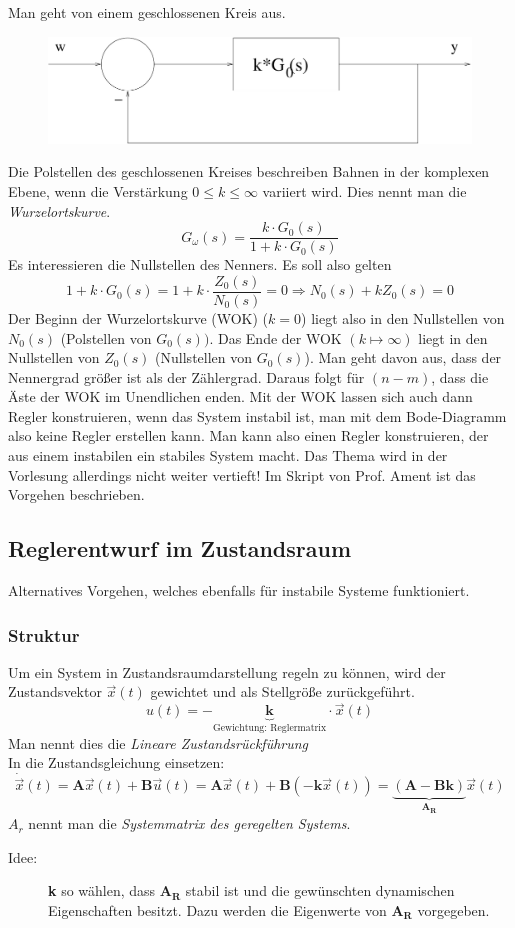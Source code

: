 \message{ !name(Mitschrieb_SysRegel.tex)}\documentclass[12pt,a4paper,ngerman]{scrartcl}
\begin{document}
Man geht von einem geschlossenen Kreis aus.
\begin{figure}[H]
  \centering
  \includegraphics[width=.7\linewidth]{sysregel_No_5}
\end{figure}
Die Polstellen des geschlossenen Kreises beschreiben Bahnen in der komplexen Ebene, wenn die Verstärkung $0\leq k \leq\infty$ variiert wird. Dies nennt man die \emph{Wurzelortskurve}.
\[
G_\omega(s) =\frac{k\cdot G_0(s)}{1+k\cdot G_0(s)}
\]
Es interessieren die Nullstellen des Nenners. Es soll also gelten 
\[
1+k\cdot G_0(s)=1+k\cdot \frac{Z_0(s)}{N_0(s)}=0 \Rightarrow N_0(s)+kZ_0(s)=0
\]
Der Beginn der Wurzelortskurve (WOK) ($k=0$) liegt also in den Nullstellen von $N_0(s)$ (Polstellen von $G_0(s))$. Das Ende der WOK $(k\mapsto\infty)$ liegt in den Nullstellen von $Z_0(s)$ (Nullstellen von $G_0(s)$). Man geht davon aus, dass der Nennergrad größer ist als der Zählergrad. Daraus folgt für $(n-m)$, dass die Äste der WOK im Unendlichen enden.
Mit der WOK lassen sich auch dann Regler konstruieren, wenn das System instabil ist, man mit dem Bode-Diagramm also keine Regler erstellen kann. Man kann also einen Regler konstruieren, der aus einem instabilen ein stabiles System macht. Das Thema wird in der Vorlesung allerdings nicht weiter vertieft! Im Skript von Prof. Ament ist das Vorgehen beschrieben.

\subsection{Reglerentwurf im Zustandsraum}

Alternatives Vorgehen, welches ebenfalls für instabile Systeme funktioniert. 

\subsubsection{Struktur}

Um ein System in Zustandsraumdarstellung regeln zu können, wird der Zustandsvektor $\vec{x}(t)$ gewichtet und als Stellgröße zurückgeführt.  
\[
u(t)=-\underbrace{\mathbf{k}}_{\text{Gewichtung: Reglermatrix}}\cdot \vec{x}(t) 
\]
Man nennt dies die \emph{Lineare Zustandsrückführung}\\
In die Zustandsgleichung einsetzen:
\[
\dot{\vec{x}}(t)=\mathbf{A}\vec{x}(t)+\mathbf{B}\vec{u}(t)=\mathbf{A}\vec{x}(t)+\mathbf{B}(-\mathbf{k}\vec{x}(t))=\underbrace{(\mathbf{A}-\mathbf{Bk})}_{\mathbf{A_R}}\vec{x}(t)
\]
$A_r$ nennt man die \emph{Systemmatrix des geregelten Systems}. 
\begin{description}
\item[Idee:] \textbf{k} so wählen, dass $\mathbf{A_R}$ stabil ist und die gewünschten dynamischen Eigenschaften besitzt. Dazu werden die Eigenwerte von $\mathbf{A_R}$ vorgegeben.
\end{description}
\end{document}
